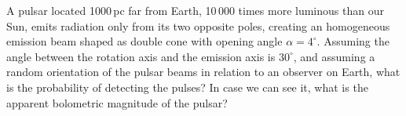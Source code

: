 A pulsar located 1000\,pc far from Earth, 10\,000 times more luminous than our
Sun, emits radiation only from its two opposite poles, creating an homogeneous
emission beam shaped as double cone with opening angle $\alpha = 4^\circ$.
Assuming the angle between the rotation axis and the emission axis is
$30^\circ$, and assuming a random orientation of the pulsar beams in relation
to an observer on Earth, what is the probability of detecting the pulses? In
case we can see it, what is the apparent bolometric magnitude of the pulsar?

